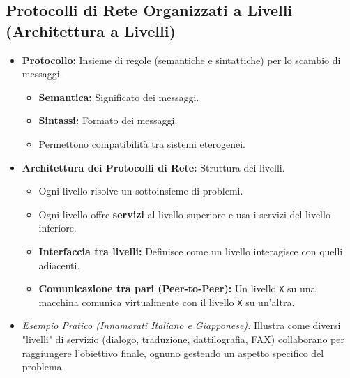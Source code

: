 \subsection{Protocolli di Rete Organizzati a Livelli (Architettura a Livelli)}
\begin{itemize}
    \item \textbf{Protocollo:} Insieme di regole (semantiche e sintattiche) per lo scambio di messaggi.
    \begin{itemize}
        \item \textbf{Semantica:} Significato dei messaggi.
        \item \textbf{Sintassi:} Formato dei messaggi.
        \item Permettono compatibilità tra sistemi eterogenei.
    \end{itemize}
    \item \textbf{Architettura dei Protocolli di Rete:} Struttura dei livelli.
    \begin{itemize}
        \item Ogni livello risolve un sottoinsieme di problemi.
        \item Ogni livello offre \textbf{servizi} al livello superiore e usa i servizi del livello inferiore.
        \item \textbf{Interfaccia tra livelli:} Definisce come un livello interagisce con quelli adiacenti.
        \item \textbf{Comunicazione tra pari (Peer-to-Peer):} Un livello \texttt{X} su una macchina comunica virtualmente con il livello \texttt{X} su un'altra.
    \end{itemize}
    \item \textit{Esempio Pratico (Innamorati Italiano e Giapponese):}
    Illustra come diversi "livelli" di servizio (dialogo, traduzione, dattilografia, FAX) collaborano per raggiungere l'obiettivo finale, ognuno gestendo un aspetto specifico del problema.
\end{itemize}

